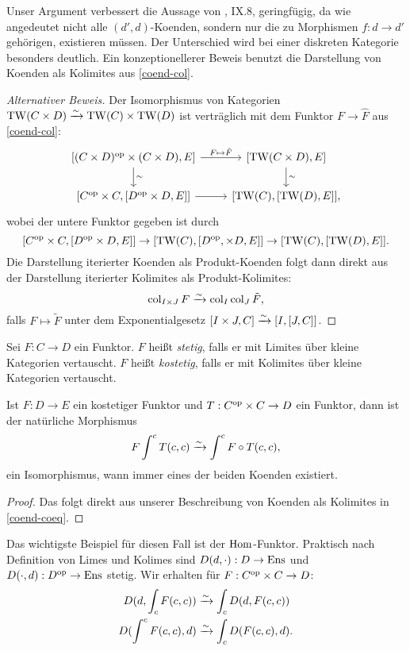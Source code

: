 \begin{bem}
  Unser Argument verbessert die Aussage von \cite{ML}, IX.8,
  geringfügig, da wie angedeutet nicht alle $(d', d)$-Koenden, sondern
  nur die zu Morphismen $f: d \to d'$ gehörigen, existieren
  müssen. Der Unterschied wird bei einer diskreten Kategorie besonders
  deutlich. Ein konzeptionellerer Beweis benutzt die Darstellung von
  Koenden als Kolimites aus \ref{coend-col}.
\end{bem}
\begin{proof}[Alternativer Beweis]
  Der Isomorphismus von Kategorien $\operatorname{TW}(C \times D) \xrightarrow[]{\sim} \operatorname{TW}(C) \times
  \operatorname{TW}(D)$ ist verträglich mit dem Funktor $F \to \hat{F}$ aus
  \ref{coend-col}:
  \[ \begin{tikzcd}
    {[(C \times D)\op \times (C \times D), E]}
    \arrow{d}{\sim} \arrow{r}{F \mapsto \hat{F}}
    & {[\TW(C \times D), E]} \arrow{d}{\sim} \\
    {[C\op \times C, [D\op \times D, E]]} \arrow{r}
    & {[\TW(C), [\TW(D), E]]},
  \end{tikzcd}
  \]
  wobei der untere Funktor gegeben ist durch
  \[ [C^\mathrm{op} \times C, [D^\mathrm{op} \times D, E]]
  \to [\operatorname{TW}(C), [D^\mathrm{op}, \times D, E]] \to [\operatorname{TW}(C), [\operatorname{TW}(D), E]].
  \]
  Die Darstellung iterierter Koenden als Produkt-Koenden folgt dann
  direkt aus der Darstellung iterierter Kolimites als
  Produkt-Kolimites:
  \[ \operatorname{col}_{I \times J} F \xrightarrow[]{\sim} \operatorname{col}_I \operatorname{col}_J \tilde{F}, \]
  falls $F \mapsto \tilde{F}$ unter dem Exponentialgesetz $[I \times
    J, C] \xrightarrow[]{\sim} {[I, [J, C]]}$.
\end{proof}

\begin{defn}
  Sei $F: C \to D$ ein Funktor. $F$ heißt \emph{stetig}, falls er mit
  Limites über kleine Kategorien vertauscht. $F$ heißt
  \emph{kostetig}, falls er mit Kolimites über kleine Kategorien
  vertauscht.
\end{defn}
\begin{lemma}
  \label{coend-cocont}
  Ist $F: D \to E$ ein kostetiger Funktor und $T: C^\mathrm{op} \times C \to D$
  ein Funktor, dann ist der natürliche Morphismus
  \[ F \int^c T(c, c) \xrightarrow[]{\sim} \int^c F \circ T(c, c), \]
  ein Isomorphismus, wann immer eines der beiden Koenden existiert.
\end{lemma}
\begin{proof}
  Das folgt direkt aus unserer Beschreibung von Koenden als Kolimites
  in \ref{coend-coeq}.
\end{proof}
\begin{bem}
  Das wichtigste Beispiel für diesen Fall ist der
  $\operatorname{Hom}$-Funktor. Praktisch nach Definition von Limes und Kolimes sind
  $D(d, \cdot): D \to \operatorname{Ens}$ und $D(\cdot, d): D^\mathrm{op} \to \operatorname{Ens}$
  stetig. Wir erhalten für $F: C^\mathrm{op} \times C \to D$:
  \begin{align*}
    D(d, \int_c F(c, c)) & \xrightarrow[]{\sim} \int_c D(d, F(c, c)) \\
    D(\int^c F(c, c), d) &\xrightarrow[]{\sim} \int_c D(F(c, c), d).
  \end{align*}
\end{bem}

